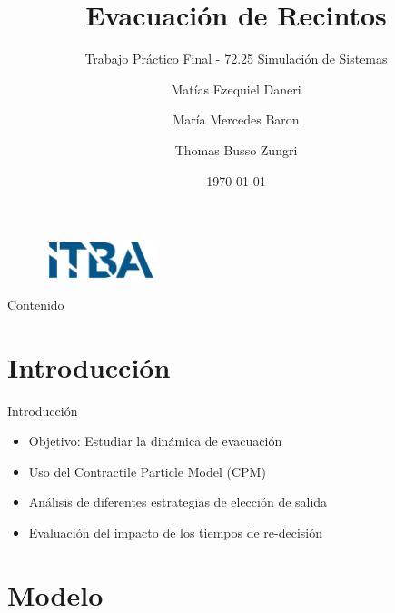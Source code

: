 \documentclass[aspectratio=169]{beamer}
\title{Evacuación de Recintos}
\subtitle{Trabajo Práctico Final - 72.25 Simulación de Sistemas}
\author{Matías Ezequiel Daneri \and María Mercedes Baron \and Thomas Busso Zungri}
\institute{Instituto Tecnológico de Buenos Aires}
\date{\today}
\begin{document}
\begin{frame}
    \titlepage
    \begin{figure}[h]
        \centering
        \includegraphics[width=0.3\textwidth]{img/Logo.png}
    \end{figure}
\end{frame}

\begin{frame}{Contenido}
    \tableofcontents
\end{frame}

\section{Introducción}
\begin{frame}{Introducción}
    \begin{itemize}
        \item Objetivo: Estudiar la dinámica de evacuación
        \item Uso del Contractile Particle Model (CPM)
        \item Análisis de diferentes estrategias de elección de salida
        \item Evaluación del impacto de los tiempos de re-decisión
    \end{itemize}
\end{frame}

\section{Modelo}
\end{document}
